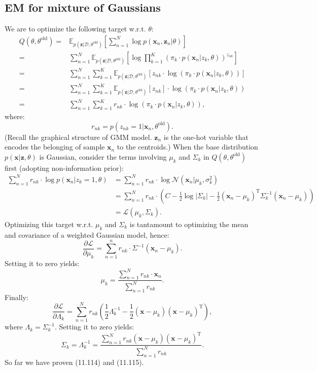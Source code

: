 \documentclass[UTF8]{ctexart}
\begin{document}
\subsection{EM for mixture of Gaussians}
We are to optimize the following target w.r.t. $\theta$:
\begin{align}
Q(\theta,\theta^{\text{old}})=&\mathbb{E}_{p(\textbf{z}|\mathcal{D},\theta^{\text{old}})}\left[\sum_{n=1}^{N}\log p(\textbf{x}_{n},\textbf{z}_{n}|\theta)\right]\nonumber \\
=&\sum_{n=1}^{N}\mathbb{E}_{p(\textbf{z}|\mathcal{D},\theta^{\text{old}})}\left[\log \prod_{k=1}^{K}(\pi_{k}\cdot p(\textbf{x}_{n}|z_{k},\theta))^{z_{nk}}\right]\nonumber \\
=&\sum_{n=1}^{N}\sum_{k=1}^{K}\mathbb{E}_{p(\textbf{z}|\mathcal{D},\theta^{\text{old}})} \left[z_{nk}\cdot \log (\pi_{k}\cdot p(\textbf{x}_{n}|z_{k},\theta))\right]\nonumber\\
=&\sum_{n=1}^{N}\sum_{k=1}^{K}\mathbb{E}_{p(\textbf{z}|\mathcal{D},\theta^{\text{old}})} \left[z_{nk}\right]\cdot \log (\pi_{k}\cdot p(\textbf{x}_{n}|z_{k},\theta))\nonumber\\
=&\sum_{n=1}^{N}\sum_{k=1}^{K}r_{nk}\cdot \log (\pi_{k}\cdot p(\textbf{x}_{n}|z_{k},\theta)), \nonumber
\end{align}
where:
$$r_{nk}=p(z_{nk}=1|\textbf{x}_{n},\theta^{\text{old}}).$$
(Recall the graphical structure of GMM model. $\textbf{z}_{n}$ is the one-hot variable that encodes the belonging of sample $\textbf{x}_{n}$ to the centroids.)
When the base distribution $p(\textbf{x}|\textbf{z},\theta)$ is Gaussian, consider the terms involving $\mu_{k}$ and $\Sigma_{k}$ in $Q(\theta,\theta^{\text{old}})$ first (adopting non-information prior):
$$
\begin{aligned}
\sum_{n=1}^{N}r_{nk}\cdot \log p(\textbf{x}_{n}|z_{k}=1,\theta) &= \sum_{n=1}^{N} r_{nk} \cdot \log \mathcal{N}(\textbf{x}_{n}|\mu_{k},\sigma^{2}_{k})\\
&=\sum_{n=1}^{N}r_{nk}\cdot\left(C-\frac{1}{2}\log|\Sigma_{k}|-\frac{1}{2}(\textbf{x}_{n}-\mu_{k})^{\text{T}}\Sigma_{k}^{-1}(\textbf{x}_{n}-\mu_{k}) \right)\\
&=\mathcal{L}(\mu_{k},\Sigma_{k}).
\end{aligned}
$$
Optimizing this target w.r.t. $\mu_{k}$ and $\Sigma_{k}$ is tantamount to optimizing the mean and covariance of a weighted Gaussian model, hence:
$$\frac{\partial \mathcal{L}}{\partial \mu_{k}}=\sum_{n=1}^{n}r_{nk}\cdot\Sigma^{-1}(\textbf{x}_{n}-\mu_{k}).$$
Setting it to zero yields:
$$\mu_{k}=\frac{\sum_{n=1}^{N}r_{nk}\cdot \textbf{x}_{n}}{\sum_{n=1}^{N}r_{nk}}.$$
Finally:
$$\frac{\partial \mathcal{L}}{\partial \Lambda_{k}}=\sum_{n=1}^{N}r_{nk}\left(\frac{1}{2}\Lambda_{k}^{-1}-\frac{1}{2}(\textbf{x}-\mu_{k})(\textbf{x}-\mu_{k})^{\text{T}} \right),$$
where $\Lambda_{k}=\Sigma^{-1}_{k}$.
Setting it to zero yields:
$$\Sigma_{k}=\Lambda_{k}^{-1}=\frac{\sum_{n=1}^{N}r_{nk} (\textbf{x}-\mu_{k})(\textbf{x}-\mu_{k})^{\text{T}}  }{\sum_{n=1}^{N}r_{nk}}.$$
So far we have proven (11.114) and (11.115).
\end{document}
